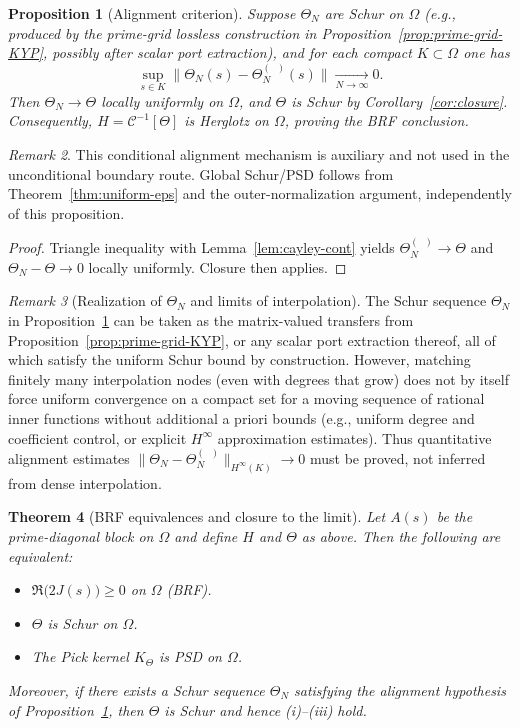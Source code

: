 \documentclass[11pt]{article}
\newtheorem{theorem}{Theorem}
\newtheorem{proposition}[theorem]{Proposition}
\theoremstyle{remark}
\newtheorem{remark}[theorem]{Remark}
\DeclareMathOperator{\dettwo}{det_2}
\begin{document}
\begin{proposition}[Alignment criterion]\label{prop:alignment-criterion}
Suppose \(\Theta_N\) are Schur on \(\Omega\) (e.g., produced by the prime-grid lossless construction in Proposition~\ref{prop:prime-grid-KYP}, possibly after scalar port extraction), and for each compact \(K\subset\Omega\) one has
\[
 \sup_{s\in K}\big\|\Theta_N(s)-\Theta_N^{(\dettwo)}(s)\big\|\xrightarrow[N\to\infty]{}0.
\]
Then \(\Theta_N\to\Theta\) locally uniformly on \(\Omega\), and \(\Theta\) is Schur by Corollary~\ref{cor:closure}. Consequently, \(H=\mathcal C^{-1}[\Theta]\) is Herglotz on \(\Omega\), proving the BRF conclusion.
\end{proposition}
\begin{remark}
This conditional alignment mechanism is auxiliary and not used in the unconditional boundary route. Global Schur/PSD follows from Theorem~\ref{thm:uniform-eps} and the outer-normalization argument, independently of this proposition.
\end{remark}
\begin{proof}
Triangle inequality with Lemma~\ref{lem:cayley-cont} yields \(\Theta_N^{(\dettwo)}\to\Theta\) and \(\Theta_N-\Theta\to 0\) locally uniformly. Closure then applies.
\end{proof}

\begin{remark}[Realization of \(\Theta_N\) and limits of interpolation]
The Schur sequence \(\Theta_N\) in Proposition~\ref{prop:alignment-criterion} can be taken as the matrix-valued transfers from Proposition~\ref{prop:prime-grid-KYP}, or any scalar port extraction thereof, all of which satisfy the uniform Schur bound by construction. However, matching finitely many interpolation nodes (even with degrees that grow) does not by itself force uniform convergence on a compact set for a moving sequence of rational inner functions without additional a priori bounds (e.g., uniform degree and coefficient control, or explicit $H^\infty$ approximation estimates). Thus quantitative alignment estimates \(\|\Theta_N-\Theta_N^{(\dettwo)}\|_{H^\infty(K)}\to 0\) must be proved, not inferred from dense interpolation.
\end{remark}

\begin{theorem}[BRF equivalences and closure to the limit]\label{thm:BRF}
Let \(A(s)\) be the prime-diagonal block on \(\Omega\) and define \(H\) and \(\Theta\) as above. Then the following are equivalent:
\begin{itemize}
\item[(i)] \(\Re\big(2J(s)\big)\ge 0\) on \(\Omega\) (BRF).
 \item[(ii)] \(\Theta\) is Schur on \(\Omega\).
 \item[(iii)] The Pick kernel \(K_\Theta\) is PSD on \(\Omega\).
\end{itemize}
Moreover, if there exists a Schur sequence \(\Theta_N\) satisfying the alignment hypothesis of Proposition~\ref{prop:alignment-criterion}, then \(\Theta\) is Schur and hence (i)--(iii) hold.
\end{theorem}
\end{document}
